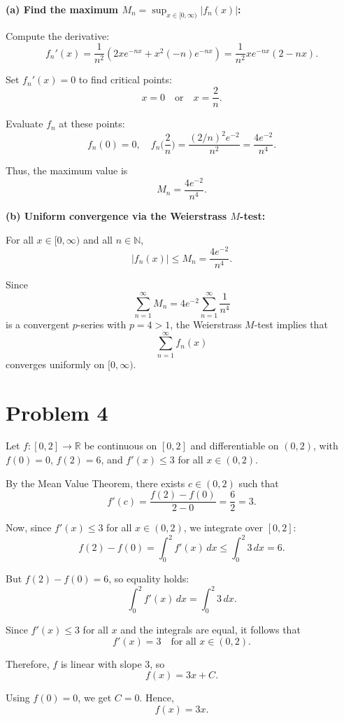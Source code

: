 \documentclass[12pt]{article}
\begin{document}
\textbf{(a) Find the maximum \(M_n = \sup_{x \in [0,\infty)} |f_n(x)|\):}

Compute the derivative:
\[
	f_n'(x) = \frac{1}{n^2} \left( 2x e^{-nx} + x^2 (-n) e^{-nx} \right)
	= \frac{1}{n^2} x e^{-nx} (2 - nx).
\]

Set \( f_n'(x) = 0 \) to find critical points:
\[
	x = 0 \quad \text{or} \quad x = \frac{2}{n}.
\]

Evaluate \( f_n \) at these points:
\[
	f_n(0) = 0, \quad f_n\Big(\frac{2}{n}\Big) = \frac{(2/n)^2 e^{-2}}{n^2} = \frac{4 e^{-2}}{n^4}.
\]

Thus, the maximum value is
\[
	\boxed{M_n = \frac{4 e^{-2}}{n^4}}.
\]

\textbf{(b) Uniform convergence via the Weierstrass \(M\)-test:}

For all \( x \in [0,\infty) \) and all \( n \in \mathbb{N} \),
\[
	|f_n(x)| \le M_n = \frac{4 e^{-2}}{n^4}.
\]

Since
\[
	\sum_{n=1}^{\infty} M_n = 4 e^{-2} \sum_{n=1}^{\infty} \frac{1}{n^4}
\]
is a convergent \(p\)-series with \(p=4>1\), the Weierstrass \(M\)-test implies that
\[
	\sum_{n=1}^{\infty} f_n(x)
\]
converges uniformly on \( [0,\infty) \).

\section*{Problem 4}
Let \( f : [0,2] \to \mathbb{R} \) be continuous on \( [0,2] \) and differentiable on \( (0,2) \), with \( f(0)=0 \), \( f(2)=6 \), and \( f'(x) \le 3 \) for all \( x \in (0,2) \).

By the Mean Value Theorem, there exists \( c \in (0,2) \) such that
\[
	f'(c) = \frac{f(2) - f(0)}{2-0} = \frac{6}{2} = 3.
\]

Now, since \( f'(x) \le 3 \) for all \( x \in (0,2) \), we integrate over \( [0,2] \):
\[
	f(2) - f(0) = \int_0^2 f'(x)\,dx \le \int_0^2 3\,dx = 6.
\]

But \( f(2) - f(0) = 6 \), so equality holds:
\[
	\int_0^2 f'(x)\,dx = \int_0^2 3\,dx.
\]

Since \( f'(x) \le 3 \) for all \( x \) and the integrals are equal, it follows that
\[
	f'(x) = 3 \quad \text{for all } x \in (0,2).
\]

Therefore, \( f \) is linear with slope \( 3 \), so
\[
	f(x) = 3x + C.
\]

Using \( f(0)=0 \), we get \( C=0 \). Hence,
\[
	\boxed{f(x) = 3x.}
\]
\end{document}
